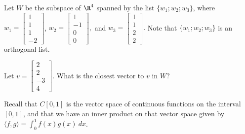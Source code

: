\endedxtext






\edXsolution{ 
}

\endedxproblem





\endedxvertical









Let $W$ be the subspace of $\R^4$ spanned by the list $\{w_1; w_2; w_3\}$, where 
$w_1 = \left[\begin{array}{c} 1 \\ 1 \\ 1 \\ -2 
\end{array} \right]$, $w_2 = \left[\begin{array}{c} 1 \\ -1 \\ 0 \\ 0 
\end{array} \right], $ and $w_3 = \left[\begin{array}{c} 1 \\ 1 \\ 2 \\ 2 
\end{array} \right]. $  Note that $\{w_1; w_2; w_3\}$ is an orthogonal list.  

Let $v = \left[\begin{array}{c} 2 \\ 2 \\ -3 \\ 4 
\end{array} \right].$  What is the closest vector to $v$ in $W$?  





\edXsolution{ 
}

\endedxproblem



Recall that $C[0,1]$ is the vector space of continuous functions on the interval $[0,1]$, and that
we have an inner product on that vector space given by $\langle f, g \rangle = \int_0^1 f(x)g(x) \ dx$.  


